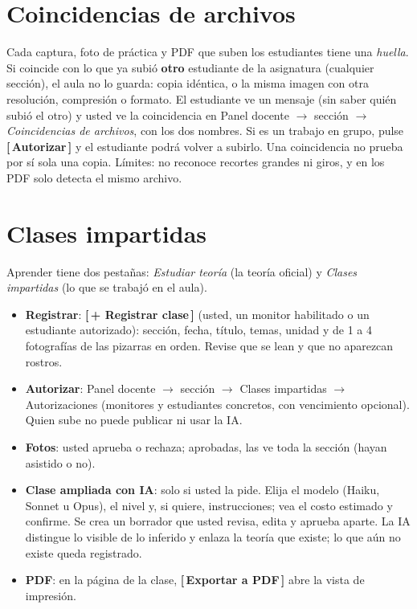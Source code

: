 \documentclass[11pt,a4paper,oneside]{book}
\newcommand{\boton}[1]{\textsf{\textbf{[\,#1\,]}}}
\begin{document}
\section{Coincidencias de archivos}
Cada captura, foto de práctica y PDF que suben los estudiantes tiene una \emph{huella}. Si coincide con lo que ya subió
\textbf{otro} estudiante de la asignatura (cualquier sección), el aula no lo guarda: copia idéntica, o la misma imagen con otra
resolución, compresión o formato. El estudiante ve un mensaje (sin saber quién subió el otro) y usted ve la coincidencia en
Panel docente $\rightarrow$ sección $\rightarrow$ \emph{Coincidencias de archivos}, con los dos nombres. Si es un trabajo en grupo,
pulse \boton{Autorizar} y el estudiante podrá volver a subirlo. Una coincidencia no prueba por sí sola una copia. Límites: no
reconoce recortes grandes ni giros, y en los PDF solo detecta el mismo archivo.

\section{Clases impartidas}
Aprender tiene dos pestañas: \emph{Estudiar teoría} (la teoría oficial) y \emph{Clases impartidas} (lo que se trabajó en el aula).
\begin{itemize}
  \item \textbf{Registrar}: \boton{+ Registrar clase} (usted, un monitor habilitado o un estudiante autorizado): sección, fecha,
        título, temas, unidad y de 1 a 4 fotografías de las pizarras en orden. Revise que se lean y que no aparezcan rostros.
  \item \textbf{Autorizar}: Panel docente $\rightarrow$ sección $\rightarrow$ Clases impartidas $\rightarrow$ Autorizaciones (monitores y
        estudiantes concretos, con vencimiento opcional). Quien sube no puede publicar ni usar la IA.
  \item \textbf{Fotos}: usted aprueba o rechaza; aprobadas, las ve toda la sección (hayan asistido o no).
  \item \textbf{Clase ampliada con IA}: solo si usted la pide. Elija el modelo (Haiku, Sonnet u Opus), el nivel y, si quiere,
        instrucciones; vea el costo estimado y confirme. Se crea un borrador que usted revisa, edita y aprueba aparte.
        La IA distingue lo visible de lo inferido y enlaza la teoría que existe; lo que aún no existe queda registrado.
  \item \textbf{PDF}: en la página de la clase, \boton{Exportar a PDF} abre la vista de impresión.
\end{itemize}
\end{document}
